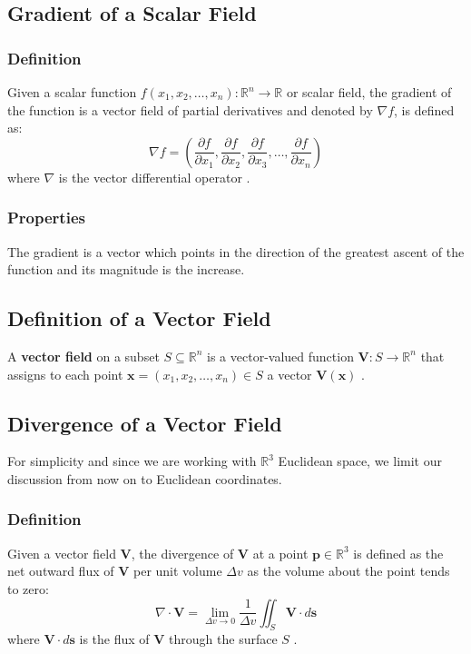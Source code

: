 \subsection{Gradient of a Scalar Field}
\subsubsection{Definition}
Given a scalar function \( f(x_1, x_2, \ldots, x_n): \mathbb{R}^n \to \mathbb{R} 
\) or scalar field, the gradient of the function is a vector field of partial 
derivatives and denoted by \( \nabla f \), is defined as:
\begin{equation}
\nabla f = \left( \frac{\partial f}{\partial x_1}, \frac{\partial f}{\partial 
x_2}, \frac{\partial f}{\partial x_3}, \ldots, \frac{\partial f}{\partial x_n} 
\right)
\end{equation}
where \( \nabla \) is the vector differential operator \cite{math-book}.

\subsubsection{Properties}
The gradient is a vector which points in the direction of the greatest ascent of 
the function and its magnitude is the increase.

\subsection{Definition of a Vector Field}
A \textbf{vector field} on a subset \(S \subseteq \mathbb{R}^n\) is a 
vector-valued function \(\mathbf{V}: S \to \mathbb{R}^n\) that assigns to each 
point \(\mathbf{x} = (x_1, x_2, \ldots, x_n) \in S\) a vector 
\(\mathbf{V}(\mathbf{x})\) \cite{math-book}.

\subsection{Divergence of a Vector Field}
For simplicity and since we are working with \(\mathbb{R}^3\) Euclidean space, we 
limit our discussion from now on to Euclidean coordinates.

\subsubsection{Definition}
Given a vector field \(\mathbf{V}\), the divergence of \(\mathbf{V}\) at a point 
\( \mathbf{p} \in \mathbb{R}^3 \) is defined as the net outward flux of 
\(\mathbf{V}\) per unit volume \(\Delta v\) as the volume about the point tends 
to zero:
\begin{equation}
\nabla \cdot \mathbf{V} = \lim_{\Delta v \to 0} \frac{1}{\Delta v} \iint_S 
\mathbf{V} \cdot d\mathbf{s}
\label{eq:divergence}
\end{equation}
where \( \mathbf{V} \cdot d\mathbf{s} \) is the flux of \( \mathbf{V} \) through 
the surface \(S\) \cite{book-magnetism}.

